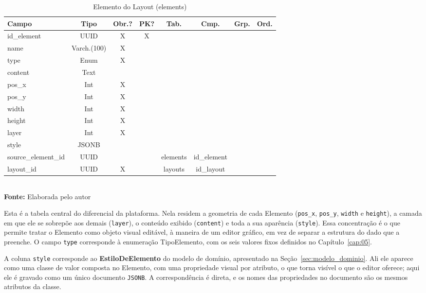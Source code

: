 \FloatBarrier
\begin{table}[!htbp]
\centering
\caption{Elemento do Layout (elements)}
\footnotesize
\begin{tabularx}{\textwidth}{ | X | c | c | c | c | c | c | c | }
    \hline
    \textbf{Campo} & \textbf{Tipo} & \textbf{Obr.?} & \textbf{PK?} & \textbf{Tab.} & \textbf{Cmp.} & \textbf{Grp.} & \textbf{Ord.}\\ \hline
    id\_element & UUID & X & X &  &  &  &  \\ \hline
    name & Varch.(100) & X &  &  &  &  &  \\ \hline
    type & Enum & X &  &  &  &  &  \\ \hline
    content & Text &  &  &  &  &  &  \\ \hline
    pos\_x & Int & X &  &  &  &  &  \\ \hline
    pos\_y & Int & X &  &  &  &  &  \\ \hline
    width & Int & X &  &  &  &  &  \\ \hline
    height & Int & X &  &  &  &  &  \\ \hline
    layer & Int & X &  &  &  &  &  \\ \hline
    style & JSONB &  &  &  &  &  &  \\ \hline
    source\_element\_id & UUID &  &  & elements & id\_element &  &  \\ \hline
    layout\_id & UUID & X &  & layouts & id\_layout &  &  \\ \hline
\end{tabularx}
\vspace{0.1cm} \\ \textbf{Fonte:} Elaborada pelo autor
\label{tab:tabelaElementDetalhado}
\end{table}

Esta é a tabela central do diferencial da plataforma. Nela residem a geometria de cada Elemento (\texttt{pos\_x}, \texttt{pos\_y}, \texttt{width} e \texttt{height}), a camada em que ele se sobrepõe aos demais (\texttt{layer}), o conteúdo exibido (\texttt{content}) e toda a sua aparência (\texttt{style}). Essa concentração é o que permite tratar o Elemento como objeto visual editável, à maneira de um editor gráfico, em vez de separar a estrutura do dado que a preenche. O campo \texttt{type} corresponde à enumeração TipoElemento, com os seis valores fixos definidos no Capítulo~\ref{cap:05}.

A coluna \texttt{style} corresponde ao \textbf{EstiloDeElemento} do modelo de domínio, apresentado na Seção~\ref{sec:modelo_dominio}. Ali ele aparece como uma classe de valor composta no Elemento, com uma propriedade visual por atributo, o que torna visível o que o editor oferece; aqui ele é gravado como um único documento \texttt{JSONB}. A correspondência é direta, e os nomes das propriedades no documento são os mesmos atributos da classe.

